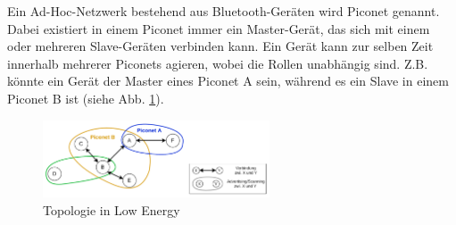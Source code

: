 Ein Ad-Hoc-Netzwerk bestehend aus Bluetooth-Geräten wird Piconet genannt. Dabei existiert in einem Piconet immer ein Master-Gerät, das sich mit einem oder mehreren Slave-Geräten verbinden kann. Ein Gerät kann zur selben Zeit innerhalb mehrerer Piconets agieren, wobei die Rollen unabhängig sind. Z.B. könnte ein Gerät der Master eines Piconet A sein, während es ein Slave in einem Piconet B ist (siehe Abb. \ref{fig: le topologie}). \cite{BtSpec4.0_181}

\begin{figure}[H]
    \centering
    \includegraphics[width=0.6\textwidth]{graphics/le_topologie.pdf}
    \caption[Topologie in Low Energy]{Topologie in Low Energy}
    \label{fig: le topologie}
\end{figure}